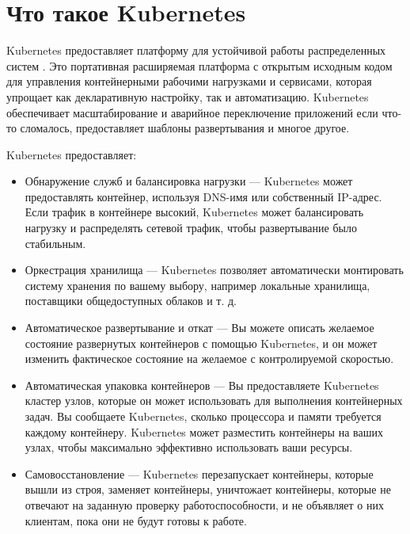 \documentclass[a4page]{article}
\begin{document}
\section{Что такое Kubernetes}
Kubernetes предоставляет платформу для устойчивой работы распределенных систем \cite{k8s:why-k8s}. Это портативная расширяемая платформа с открытым исходным кодом для управления контейнерными рабочими нагрузками и сервисами, которая упрощает как декларативную настройку, так и автоматизацию. Kubernetes обеспечивает масштабирование и аварийное переключение приложений если что-то сломалось, предоставляет шаблоны развертывания и многое другое.

Kubernetes предоставляет:
\begin{itemize}
  \item Обнаружение служб и балансировка нагрузки --- Kubernetes может предоставлять контейнер, используя DNS-имя или собственный IP-адрес. Если трафик в контейнере высокий, Kubernetes может балансировать нагрузку и распределять сетевой трафик, чтобы развертывание было стабильным.
  \item Оркестрация хранилища --- Kubernetes позволяет автоматически монтировать систему хранения по вашему выбору, например локальные хранилища, поставщики общедоступных облаков и т.
д.
\item Автоматическое развертывание и откат --- Вы можете описать желаемое состояние развернутых контейнеров с помощью Kubernetes, и он может изменить фактическое состояние на желаемое с контролируемой скоростью.
\item Автоматическая упаковка контейнеров --- Вы предоставляете Kubernetes кластер узлов, которые он может использовать для выполнения контейнерных задач. Вы сообщаете Kubernetes, сколько процессора и памяти требуется каждому контейнеру. Kubernetes может разместить контейнеры на ваших узлах, чтобы максимально эффективно использовать ваши ресурсы.
\item Самовосстановление --- Kubernetes перезапускает контейнеры, которые вышли из строя, заменяет контейнеры, уничтожает контейнеры, которые не отвечают на заданную проверку работоспособности, и не объявляет о них клиентам, пока они не будут готовы к работе.
\end{itemize}
\end{document}

